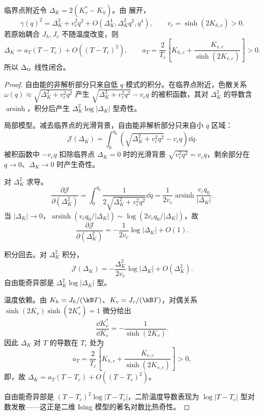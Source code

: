 临界点附近令 \(\Delta_K=2(K_v^*-K_h)\)。由 展开，
\begin{equation}
 \gamma(q)^2
 =\Delta_K^2+v_c^2q^2
 +O(\Delta_K^4,\Delta_K^2q^2,q^4),
 \qquad
 v_c=\sinh(2K_{h,c})>0.
 \label{eq:phys-sm-critical-dispersion}
\end{equation}
若原始耦合 \(J_h,J_v\) 不随温度改变，则
\begin{equation}
 \Delta_K=a_T(T-T_c)+O((T-T_c)^2),
 \qquad
 a_T=\frac{2}{T_c}
 \left[
 K_{h,c}+\frac{K_{v,c}}{\sinh(2K_{v,c})}
 \right]>0.
 \label{eq:phys-sm-gap-temperature-slope}
\end{equation}
所以 \(\Delta_{\rm tr}\) 线性闭合。

\begin{proof}
自由能的非解析部分只来自低 $q$ 模式的积分。在临界点附近，色散关系 $\omega(q)\approx\sqrt{\Delta_K^2+v_c^2q^2}$ 产生 $\sqrt{\Delta_K^2+v_c^2q^2}-v_cq$ 的被积函数，其对 $\Delta_K^2$ 的导数含 $\operatorname{arsinh}$，积分后产生 $\Delta_K^2\log|\Delta_K|$ 型奇性。

局部模型。减去临界点的光滑背景，自由能非解析部分只来自小 $q$ 区域：
\begin{equation*}
 \mathcal J(\Delta_K)
 =\int_0^{q_0}
 \left(\sqrt{\Delta_K^2+v_c^2q^2}-v_cq\right)\dd q.
\end{equation*}
被积函数中 $-v_cq$ 扣除临界点 $\Delta_K=0$ 时的光滑背景 $\sqrt{v_c^2q^2}=v_cq$，剩余部分在 $q\to0$、$\Delta_K\to0$ 时产生奇性。

对 $\Delta_K^2$ 求导。
\begin{equation*}
 \frac{\partial\mathcal J}{\partial(\Delta_K^2)}
 =\int_0^{q_0}\frac{1}{2\sqrt{\Delta_K^2+v_c^2q^2}}\dd q
 =\frac{1}{2v_c}\operatorname{arsinh}\frac{v_cq_0}{|\Delta_K|}.
\end{equation*}
当 $|\Delta_K|\to0$，$\operatorname{arsinh}(v_cq_0/|\Delta_K|)\sim\log(2v_cq_0/|\Delta_K|)$，故
\begin{equation*}
 \frac{\partial\mathcal J}{\partial(\Delta_K^2)}
 =-\frac{1}{2v_c}\log|\Delta_K|+O(1).
\end{equation*}

积分回去。对 $\Delta_K^2$ 积分，
\begin{equation*}
 \mathcal J(\Delta_K)
 =-\frac{\Delta_K^2}{2v_c}\log|\Delta_K|
 +O(\Delta_K^2).
\end{equation*}
自由能奇异部是 $\Delta_K^2\log|\Delta_K|$ 型。

温度依赖。由 $K_h=J_h/(\kB T)$、$K_v=J_v/(\kB T)$，对偶关系 $\sinh(2K_v)\sinh(2K_v^*)=1$ 微分给出
\begin{equation*}
 \frac{\dd K_v^*}{\dd K_v}
 =-\frac{1}{\sinh(2K_v)}.
\end{equation*}
因此 $\Delta_K$ 对 $T$ 的导数在 $T_c$ 处为
\begin{equation*}
 a_T=\frac{2}{T_c}
 \left[K_{h,c}+\frac{K_{v,c}}{\sinh(2K_{v,c})}\right]>0,
\end{equation*}
即，故 $\Delta_K=a_T(T-T_c)+O((T-T_c)^2)$。

自由能奇异部是 $(T-T_c)^2\log|T-T_c|$，二阶温度导数表现为 $\log|T-T_c|$ 型对数发散——这正是二维 Ising 模型的著名对数比热奇性。
\end{proof}

